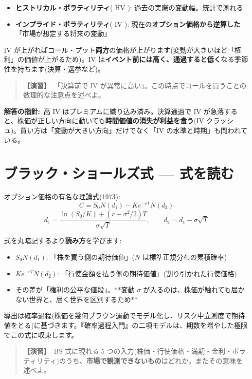 \documentclass{article}
\begin{document}
\begin{itemize}
\item \textbf{ヒストリカル・ボラティリティ}( HV ): 過去の実際の変動幅。統計で測れる
\item \textbf{インプライド・ボラティリティ}( IV ): 現在の\textbf{オプション価格から逆算した}「市場が想定する将来の変動」
\end{itemize}

IV が上がればコール・プット\textbf{両方}の価格が上がります(変動が大きいほど「権利」の価値が上がるため)。IV は\textbf{イベント前には高く、通過すると低く}なる季節性を持ちます(決算・選挙など)。

\begin{quote}
\textbf{【演習】}\ 「決算前で IV が異常に高い」。この時点でコールを買うことの数理的な注意点を述べよ。
\end{quote}

\textbf{解答の指針:}\ 高 IV はプレミアムに織り込み済み。決算通過で IV が急落すると、株価が正しい方向に動いても\textbf{時間価値の消失が利益を食う}(IV クラッシュ)。買い方は「変動が大きい方向」だけでなく「IV の水準と時期」も問われている。

\section{ブラック・ショールズ式 — 式を読む}

オプション価格の有名な理論式(1973):
\[ C = S_0 N(d_1) - K e^{-rT} N(d_2) \]
\[ d_1 = \frac{\ln(S_0/K) + (r + \sigma^2/2)T}{\sigma \sqrt{T}}, \qquad d_2 = d_1 - \sigma \sqrt{T} \]

式を丸暗記するより\textbf{読み方}を学びます:
\begin{itemize}
\item \(S_0 N(d_1)\): 「株を買う側の期待価値」(\(N\) は標準正規分布の累積確率)
\item \(K e^{-rT} N(d_2)\): 「行使金額を払う側の期待価値」(割り引かれた行使価格)
\item その差が「権利の公平な値段」。**変動 \( \sigma \) が入るのは、株価が触れても届かない世界と、届く世界を区別するため**
\end{itemize}

導出は確率過程(株価を幾何ブラウン運動でモデル化し、リスク中立測度で期待値をとる)に基づきます。『確率過程入門』の二項モデルは、期数を増やした極限でこの式に収束します。

\begin{quote}
\textbf{【演習】}\ BS 式に現れる 5 つの入力(株価・行使価格・満期・金利・ボラティリティ)のうち、\textbf{市場で観測できないもの}はどれか。またその意味を述べよ。
\end{quote}
\end{document}
